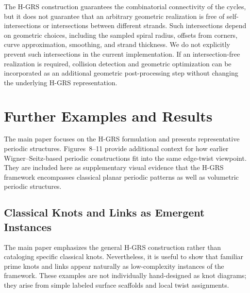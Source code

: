 \documentclass[acmtog]{acmart}
\begin{document}
The H-GRS construction guarantees the combinatorial connectivity of the
cycles, but it does not guarantee that an arbitrary geometric realization is
free of self-intersections or intersections between different strands. Such
intersections depend on geometric choices, including the sampled spiral
radius, offsets from corners, curve approximation, smoothing, and strand
thickness. We do not explicitly prevent such intersections in the current
implementation. If an intersection-free realization is required, collision
detection and geometric optimization can be incorporated as an additional
geometric post-processing step without changing the underlying H-GRS
representation.




\section{Further Examples and Results}


The main paper focuses on the H-GRS formulation and presents representative periodic structures. Figures~8--11 provide additional context for how earlier Wigner--Seitz-based periodic constructions fit into the same edge-twist viewpoint. They are included here as supplementary visual evidence that the H-GRS framework encompasses classical planar periodic patterns as well as volumetric periodic structures.


\subsection{Classical Knots and Links as Emergent Instances}
\label{sec:supp_classical}

The main paper emphasizes the general H-GRS construction rather than cataloging specific classical knots. Nevertheless, it is useful to show that familiar prime knots and links appear naturally as low-complexity instances of the framework. These examples are not individually hand-designed as knot diagrams; they arise from simple labeled surface scaffolds and local twist assignments.
\end{document}
